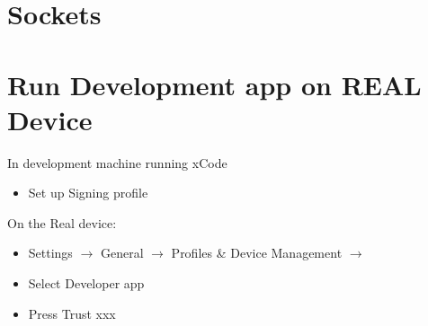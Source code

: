 \documentclass[]{article}
\newcommand{\<}{\guilsinglleft}
\renewcommand{\>}{\guilsinglright}
\begin{document}
\section{Sockets}


\section{Run Development app on REAL Device}
In development machine running xCode
\begin{itemize}
	\item Set up Signing profile 
\end{itemize}
On the Real device:
\begin{itemize}
	\item Settings $\rightarrow$ General $\rightarrow$ Profiles \& Device Management $\rightarrow$ 
	\item Select Developer app 
	\item Press Trust xxx
\end{itemize}
\end{document}
